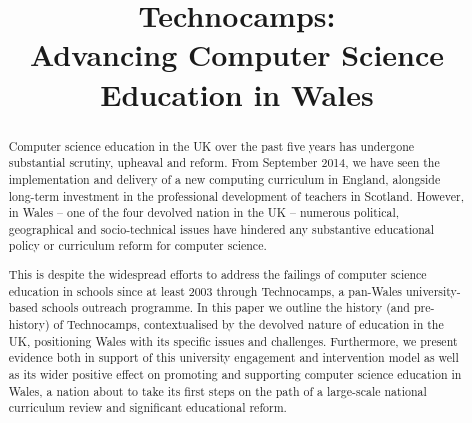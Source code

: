 \documentclass{sig-alternate}
\begin{document}
%

\title{Technocamps:\\[1ex] Advancing Computer Science Education in Wales}



\maketitle

\begin{abstract}
Computer science education in the UK over the past five years has
undergone substantial scrutiny, upheaval and reform. From September
2014, we have seen the implementation and delivery of a new computing
curriculum in England, alongside long-term investment in the
professional development of teachers in Scotland. However, in Wales --
one of the four devolved nation in the UK -- numerous political,
geographical and socio-technical issues have hindered any substantive
educational policy or curriculum reform for computer science.

This is despite the widespread efforts to address the failings of
computer science education in schools since at least 2003 through
Technocamps, a pan-Wales university-based schools outreach
programme. In this paper we outline the history (and pre-history) of
Technocamps, contextualised by the devolved nature of education in the
UK, positioning Wales with its specific issues and
challenges. Furthermore, we present evidence both in support of this
university engagement and intervention model as well as its wider
positive effect on promoting and supporting computer science education
in Wales, a nation about to take its first steps on the path of a
large-scale national curriculum review and significant educational
reform.
\end{abstract}
\end{document}

